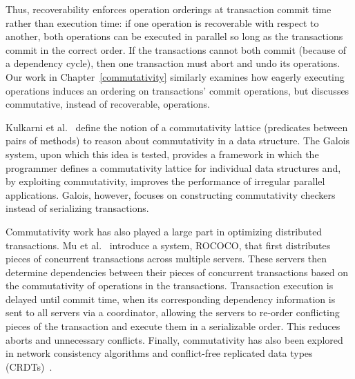 Thus, recoverability enforces operation orderings at transaction commit time rather than execution time: if one operation is recoverable with respect to another, both operations can be executed in parallel so long as the transactions commit in the correct order. If the transactions cannot both commit (because of a dependency cycle), then one transaction must abort and undo its operations. Our work in Chapter~\ref{commutativity} similarly examines how eagerly executing operations induces an ordering on transactions' commit operations, but discusses commutative, instead of recoverable, operations.

Kulkarni et al.~\cite{galois} define the notion of a commutativity lattice (predicates between pairs of methods) to reason about commutativity in a data structure. The Galois system, upon which this idea is tested, provides a framework in which the programmer defines a commutativity lattice for individual data structures and, by exploiting commutativity, improves the performance of irregular parallel applications. Galois, however, focuses on constructing commutativity checkers instead of serializing transactions.

Commutativity work has also played a large part in optimizing distributed transactions. Mu et al.~\cite{distributed} introduce a system, ROCOCO, that first distributes pieces of concurrent transactions across multiple servers. These servers then determine dependencies between their pieces of concurrent transactions based on the commutativity of operations in the transactions.
 Transaction execution is delayed until commit time, when its corresponding dependency information is sent to all servers via a coordinator, allowing the servers to re-order conflicting pieces of the transaction and execute them in a serializable order. This reduces aborts and unnecessary conflicts.
Finally, commutativity has also been explored in network consistency algorithms and conflict-free replicated data types (CRDTs)~\cite{CRDT}.
